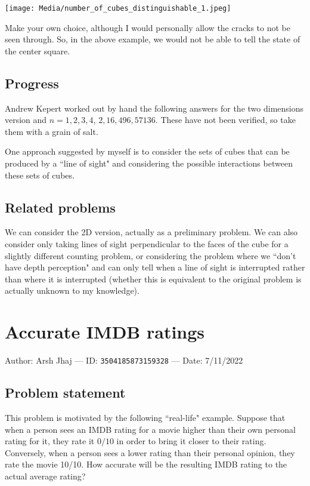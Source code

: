 \documentclass[10pt]{article}
\begin{document}
\BlankLine
\BlankLine

\texttt{[image: Media/number\_of\_cubes\_distinguishable\_1.jpeg]}

Make your own choice, although I would personally allow the cracks to not be seen through. So, in the above example, we would not be able to tell the state of the center square.

\subsection{Progress}

Andrew Kepert worked out by hand the following answers for the two dimensions version and $n=1,2,3,4$, $2,16,496,57136$. These have not been verified, so take them with a grain of salt.

One approach suggested by myself is to consider the sets of cubes that can be produced by a ``line of sight" and considering the possible interactions between these sets of cubes.

\subsection{Related problems}

We can consider the 2D version, actually as a preliminary problem. We can also consider only taking lines of sight perpendicular to the faces of the cube for a slightly different counting problem, or considering the problem where we ``don't have depth perception" and can only tell when a line of sight is interrupted rather than where it is interrupted (whether this is equivalent to the original problem is actually unknown to my knowledge).

\pagebreak



\pagebreak

\section{Accurate IMDB ratings}

Author: Arsh Jhaj --- ID: \verb`3504185873159328` --- Date: 7/11/2022

\subsection{Problem statement}

This problem is motivated by the following ``real-life" example. Suppose that when a person sees an IMDB rating for a movie higher than their own personal rating for it, they rate it $0/10$ in order to bring it closer to their rating. Conversely, when a person sees a lower rating than their personal opinion, they rate the movie 10/10. How accurate will be the resulting IMDB rating to the actual average rating?
\end{document}

